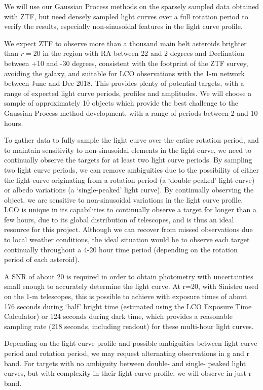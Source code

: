 \documentclass[11pt]{article}
\begin{document}
We will use our Gaussian Process methods on the sparsely sampled data
obtained with ZTF, but need densely sampled light curves over a full
rotation period to verify the results, especially non-sinusoidal
features in the light curve profile. 

We expect ZTF to observe more than a thousand main belt asteroids
brighter than $r=20$ in the region with RA between 22 and 2 degrees and 
Declination between +10 and -30 degrees, consistent with the footprint of the
ZTF survey, avoiding the galaxy, and suitable for LCO observations with
the 1-m network between June and Dec 2018. This provides plenty of
potential targets, with a range of expected light curve periods,
profiles and amplitudes. We will choose a sample of approximately 10
objects which provide the best challenge to the Gaussian Process method
development, with a range of periods between 2 and 10 hours. 

To gather data to fully sample the light curve over the entire rotation
period, and to maintain sensitivity to non-sinusoidal elements in the
light curve, we need to continually observe the targets for at least
two light curve periods. By sampling two light curve periods, we can
remove ambiguities due to the possibility of either the light-curve
originating from a rotation period (a `double-peaked' light curve) or
albedo variations (a `single-peaked' light curve).  By continually
observing the object, we are sensitive to non-sinusoidal variations in
the light curve profile. LCO is unique in its capabilities to
continually observe a target for longer than a few hours, due to its
global distribution of telescopes, and is thus an ideal resource for
this project. Although we can recover from missed observations due to
local weather conditions, the ideal situation would be to observe each
target continually throughout a 4-20 hour time period (depending on the
rotation period of each asteroid). 

A SNR of about 20 is required in order to obtain photometry with
uncertainties small enough to accurately determine the light curve. At
r=20, with Sinistro used on the 1-m telescopes, this is possible to
achieve with exposure times of about 176 seconds during `half' bright
time (estimated using the LCO Exposure Time Calculator) or 124 seconds
during dark time, which provides a reasonable sampling rate (218
seconds, including readout) for these multi-hour light curves. 

Depending on the light curve profile and possible ambiguities between
light curve period and rotation period, we may request alternating
observations in g and r band. For targets with no ambiguity between
double- and single- peaked light curves, but with complexity in their
light curve profile, we will observe in just r band.
\end{document}
